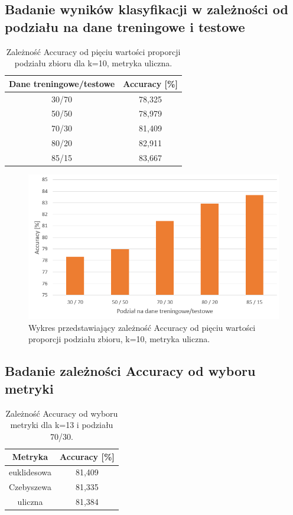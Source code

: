 \documentclass{classrep}
\begin{document}
\subsection{Badanie wyników klasyfikacji w zależności od podziału na dane treningowe i testowe}
\begin{table}[h!]
	\centering
	\begin{tabular} {c c}
		\hline
		\textbf{Dane treningowe/testowe} & \textbf{Accuracy [\%]} \\ [0.5ex] 
		\hline
		\hline 
		30/70 & 78,325 \\ 
		50/50 & 78,979 \\
		70/30 & 81,409 \\
		80/20 & 82,911 \\
		85/15 & 83,667 \\
		\hline
	\end{tabular}
	\caption{Zależność Accuracy od pięciu wartości proporcji podziału zbioru dla k=10, metryka uliczna. }
	\label{tabelaTT}
\end{table}

\begin{figure}[h!]
    \centering
    \includegraphics[width=1\textwidth]{accuracyTT.png}
    \caption{Wykres przedstawiający zależność Accuracy od pięciu wartości proporcji podziału zbioru, k=10, metryka uliczna.}
    \label{accuracyTT}
\end{figure}

\newpage
\subsection{Badanie zależności Accuracy od wyboru metryki}

\begin{table}[h!]
	\centering
	\begin{tabular} {c c}
		\hline
		\textbf{Metryka} & \textbf{Accuracy [\%]} \\ [0.5ex] 
		\hline
		\hline 
		euklidesowa & 81,409 \\ 
		Czebyszewa & 81,335 \\
		uliczna & 81,384 \\
		\hline
	\end{tabular}
	\caption{Zależność Accuracy od wyboru metryki dla k=13 i podziału 70/30. }
	\label{tabelaMetric}
\end{table}
\end{document}

